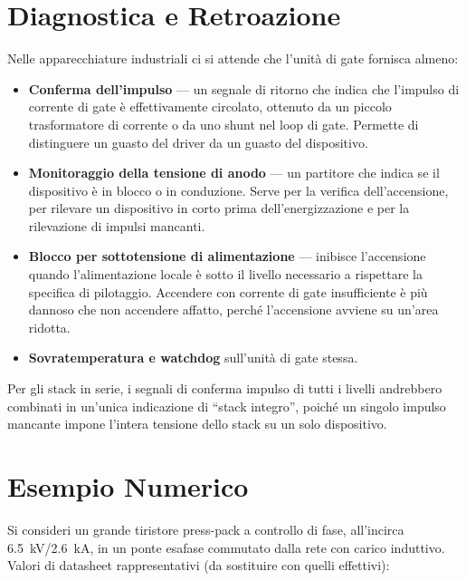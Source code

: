 \documentclass[11pt,a4paper]{article}
\begin{document}
\section{Diagnostica e Retroazione}

Nelle apparecchiature industriali ci si attende che l'unità di gate fornisca almeno:

\begin{itemize}
  \item \textbf{Conferma dell'impulso} --- un segnale di ritorno che indica che
        l'impulso di corrente di gate è effettivamente circolato, ottenuto da un
        piccolo trasformatore di corrente o da uno shunt nel loop di gate. Permette
        di distinguere un guasto del driver da un guasto del dispositivo.
  \item \textbf{Monitoraggio della tensione di anodo} --- un partitore che indica se
        il dispositivo è in blocco o in conduzione. Serve per la verifica
        dell'accensione, per rilevare un dispositivo in corto prima
        dell'energizzazione e per la rilevazione di impulsi mancanti.
  \item \textbf{Blocco per sottotensione di alimentazione} --- inibisce l'accensione
        quando l'alimentazione locale è sotto il livello necessario a rispettare la
        specifica di pilotaggio. Accendere con corrente di gate insufficiente è più
        dannoso che non accendere affatto, perché l'accensione avviene su un'area
        ridotta.
  \item \textbf{Sovratemperatura e watchdog} sull'unità di gate stessa.
\end{itemize}

Per gli stack in serie, i segnali di conferma impulso di tutti i livelli andrebbero
combinati in un'unica indicazione di ``stack integro'', poiché un singolo impulso
mancante impone l'intera tensione dello stack su un solo dispositivo.

\section{Esempio Numerico}

Si consideri un grande tiristore press-pack a controllo di fase, all'incirca
\SI{6.5}{\kilo\volt}/\SI{2.6}{\kilo\ampere}, in un ponte esafase commutato dalla
rete con carico induttivo. Valori di datasheet rappresentativi (da sostituire con
quelli effettivi):
\end{document}
